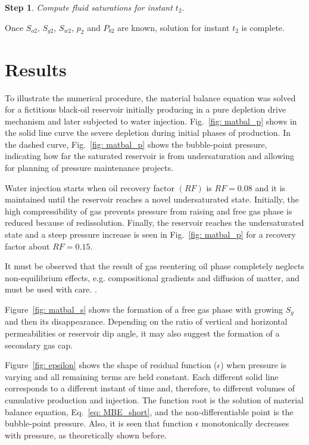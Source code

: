 \documentclass[final,authoryear,5p,twocolumn,10pt]{elsarticle}
\newtheorem{step}{Step}
\begin{document}
\begin{step}
Compute fluid saturations  for instant $t_2$.
\end{step}

Once $S_{o2}$, $S_{g2}$, $S_{w2}$, $p_2$ and $P_{b2}$ are known, solution for instant $t_2$ is complete.

\section{Results}
To illustrate the numerical procedure, the material balance equation was solved for a fictitious black-oil reservoir initially producing in a pure depletion drive mechanism and later subjected to water injection. Fig.~\ref{fig: matbal_p} shows in the solid line curve the severe depletion during initial phases of production. In the dashed curve, Fig.~\ref{fig: matbal_p} shows the bubble-point pressure, indicating how far the saturated reservoir is from undersaturation and allowing for planning of pressure maintenance projects.


Water injection starts when oil recovery factor $(RF)$ is $RF=0.08$ and it is maintained until the reservoir reaches a novel undersaturated state. Initially, the high compressibility of gas prevents pressure from raising and free gas phase is reduced because of redissolution. Finally, the reservoir reaches the undersaturated state and a steep pressure increase is seen in Fig.~\ref{fig: matbal_p} for a recovery factor about $RF=0.15$.

It must be observed that the result of gas reentering oil phase completely neglects non-equilibrium effects, e.g. compositional gradients and diffusion of matter, and must be used with care. .

Figure~\ref{fig: matbal_s} shows the formation of a free gas phase with growing $S_g$ and then its disappearance. Depending on the ratio of vertical and horizontal permeabilities or reservoir dip angle, it may also suggest the formation of a secondary gas cap.

Figure~\ref{fig: epsilon} shows the shape of residual function ($\epsilon$) when pressure is varying and all remaining terms are held constant. Each different solid line corresponds to a different instant of time and, therefore, to different volumes of cumulative production and injection. The function root is the solution of material balance equation, Eq.~\eqref{eq: MBE_short}, and the non-differentiable point is the bubble-point pressure. Also, it is seen that function $\epsilon$ monotonically decreases with pressure, as theoretically shown before.
\end{document}
